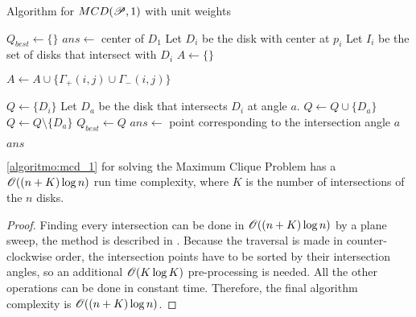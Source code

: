 \begin{algoritmo}
\caption{Algorithm for $MCD(\mathscr{P}, 1)$ with unit weights}\label{algoritmo:mcd_1}
\begin{algorithmic}[1]

\item[]

\State $Q_{best} \gets \{\}$
\State $ans \gets$ center of $D_1$
\State Let $D_i$ be the disk with center at $p_i$
\State Let $I_i$ be the set of disks that intersect with $D_i$
\State $A \gets \{\}$ 

\State $A \gets A \cup \{\Gamma_+(i,j) \cup \Gamma_-(i,j)\}$
\EndFor

\State $Q \gets \{D_i\}$ 
 
\State Let $D_a$ be the disk that intersects $D_i$ at angle $a$. 
\State $Q \gets Q \cup \{D_a\}$
\Else
\State $Q \gets Q \setminus \{D_a\}$
\EndIf
{}
\State $Q_{best} \gets Q$
\State $ans \gets $ point corresponding to the intersection angle $a$
\EndIf
\EndFor
\EndFor
\EndFor

\State \Return $ans$
\EndProcedure
\end{algorithmic}
\end{algoritmo}

\begin{lema}\label{lema:disk}
\autoref{algoritmo:mcd_1} for solving the Maximum Clique Problem has a $\mathscr{O}((n+K)\log{n})$ run time complexity, where $K$ is the number of intersections of the $n$ disks.
\end{lema}

\begin{proof}
    Finding every intersection can be done in $\mathscr{O}((n+K)\log{n})$  by a plane sweep, the method is described in \cite{bentley:1979}. 
    Because the traversal is made in counter-clockwise order, the intersection points have to be sorted by their intersection angles, so an additional $\mathscr{O}(K\log{K})$ pre-processing is needed. All the other operations can be done in constant time. Therefore, the final algorithm complexity is $\mathscr{O}((n+K)\log{n})$.
\end{proof}

